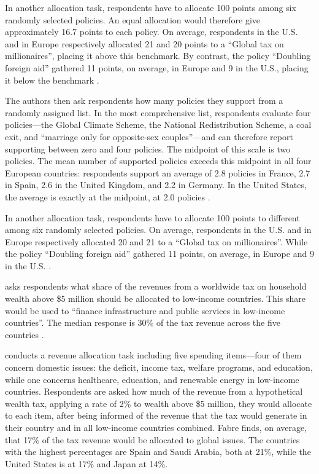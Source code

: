 In another allocation task, respondents have to allocate 100 points among six randomly selected policies. An equal allocation would therefore give approximately 16.7 points to each policy. On average, respondents in the U.S. and in Europe respectively allocated 21 and 20 points to a ``Global tax on millionaires'', placing it above this benchmark. By contrast, the policy ``Doubling foreign aid'' gathered 11 points, on average, in Europe and 9 in the U.S., placing it below the benchmark \citep[Figure S30]{fabre_majority_2025_si}.

The authors then ask respondents how many policies they support from a randomly assigned list. In the most comprehensive list, respondents evaluate four policies---the Global Climate Scheme, the National Redistribution Scheme, a coal exit, and ``marriage only for opposite-sex couples''---and can therefore report supporting between zero and four policies. The midpoint of this scale is two policies. The mean number of supported policies exceeds this midpoint in all four European countries: respondents support an average of 2.8 policies in France, 2.7 in Spain, 2.6 in the United Kingdom, and 2.2 in Germany. In the United States, the average is exactly at the midpoint, at 2.0 policies \citep[Figure S7]{fabre_majority_2025_si}.

In another allocation task, respondents have to allocate 100 points to different among six randomly selected policies. On average, respondents in the U.S. and in Europe respectively allocated 20 and 21 to a ``Global tax on millionaires''. While the policy ``Doubling foreign aid'' gathered 11 points, on average, in Europe and 9 in the U.S. \citep[Figure S30]{fabre_majority_2025_si}. 

\citet{fabre_majority_2025} asks respondents what share of the revenues from a worldwide tax on household wealth above \$5 million should be allocated to low-income countries. This share would be used to ``finance infrastructure and public services in low-income countries''. The median response is 30\% of the tax revenue across the five countries \citep[Figure S16 and ED4]{fabre_majority_2025_si}.

\citet{fabre_public_2026} conducts a revenue allocation task including five spending items---four of them concern domestic issues: the deficit, income tax, welfare programs, and education, while one concerns healthcare, education, and renewable energy in low-income countries. Respondents are asked how much of the revenue from a hypothetical wealth tax, applying a rate of 2\% to wealth above \$5 million, they would allocate to each item, after being informed of the revenue that the tax would generate in their country and in all low-income countries combined. Fabre finds, on average, that 17\% of the tax revenue would be allocated to global issues. The countries with the highest percentages are Spain and Saudi Arabia, both at 21\%, while the United States is at 17\% and Japan at 14\%.


